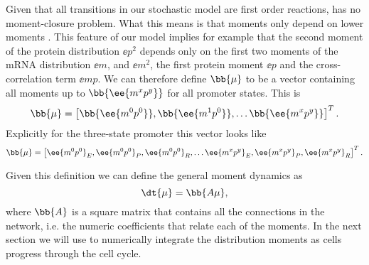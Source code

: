 Given that all transitions in our stochastic model are first order reactions,
 has no moment-closure problem. What this means is that
moments only depend on lower moments . This
feature of our model implies for example that the second moment of the protein
distribution $\ee{p^2}$ depends only on the first two moments of the mRNA
distribution $\ee{m}$, and $\ee{m^2}$, the first protein moment $\ee{p}$  and
the cross-correlation term $\ee{mp}$. We can therefore define $\bb{\mu}$ to be a
vector containing all moments up to $\bb{\ee{m^x p^y}}$ for all promoter states.
This is
\begin{equation}
\bb{\mu} = \left[ \bb{\ee{m^0 p^0}},
								  \bb{\ee{m^1 p^0}},
									\ldots \bb{\ee{m^x p^y}} \right]^T.
\end{equation}
Explicitly for the three-state promoter this vector looks like
\begin{equation}
	\bb{\mu} = \left[ \ee{m^0 p^0}_E, \ee{m^0 p^0}_P, \ee{m^0 p^0}_R, \ldots
                 \ee{m^x p^y}_E, \ee{m^x p^y}_P, \ee{m^x p^y}_R \right]^T.
\end{equation}

Given this definition we can define the general moment dynamics as
\begin{equation}
\dt{\mu} = \bb{A \mu},
\label{eq_mom_dynamics}
\end{equation}
where $\bb{A}$ is a square matrix that contains all the connections in the
network, i.e. the numeric coefficients that relate each of the moments. In the
next section we will use  to numerically integrate the
distribution moments as cells progress through the cell cycle.
